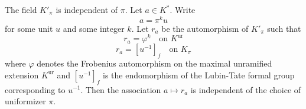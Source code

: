 \begin{theorem}
The field $K'_{\pi}$ is independent of $\pi$. Let $a \in K^{*}$. Write
$$a = \pi^{k} u$$
for some unit $u$ and some integer $k$. Let $r_{a}$ be the automorphism of $K'_{\pi}$ such that
$$r_{a} = \varphi^{k} \quad \text{on } K^{\mathrm{ur}}$$
$$r_{a} = [u^{-1}]_{f} \quad \text{on } K_{\pi}$$
where $\varphi$ denotes the Frobenius automorphism on the maximal unramified extension $K^{\mathrm{ur}}$ and $[u^{-1}]_{f}$ is the endomorphism of the Lubin-Tate formal group corresponding to $u^{-1}$. Then the association $a \mapsto r_{a}$ is independent of the choice of uniformizer $\pi$.
\end{theorem}
